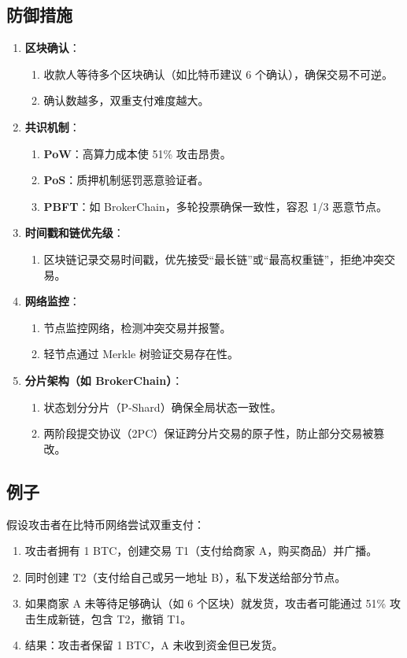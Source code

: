 \documentclass[12pt]{ctexart}
\begin{document}
\subsection{防御措施}
\begin{enumerate}
    \item \textbf{区块确认}：
        \begin{enumerate}
            \item 收款人等待多个区块确认（如比特币建议 6 个确认），确保交易不可逆。
            \item 确认数越多，双重支付难度越大。
        \end{enumerate}
    \item \textbf{共识机制}：
        \begin{enumerate}
            \item \textbf{PoW}：高算力成本使 51\% 攻击昂贵。
            \item \textbf{PoS}：质押机制惩罚恶意验证者。
            \item \textbf{PBFT}：如 BrokerChain，多轮投票确保一致性，容忍 1/3 恶意节点。
        \end{enumerate}
    \item \textbf{时间戳和链优先级}：
        \begin{enumerate}
            \item 区块链记录交易时间戳，优先接受“最长链”或“最高权重链”，拒绝冲突交易。
        \end{enumerate}
    \item \textbf{网络监控}：
        \begin{enumerate}
            \item 节点监控网络，检测冲突交易并报警。
            \item 轻节点通过 Merkle 树验证交易存在性。
        \end{enumerate}
    \item \textbf{分片架构（如 BrokerChain）}：
        \begin{enumerate}
            \item 状态划分分片（P-Shard）确保全局状态一致性。
            \item 两阶段提交协议（2PC）保证跨分片交易的原子性，防止部分交易被篡改。
        \end{enumerate}
\end{enumerate}

\subsection{例子}
假设攻击者在比特币网络尝试双重支付：
\begin{enumerate}
    \item 攻击者拥有 1 BTC，创建交易 T1（支付给商家 A，购买商品）并广播。
    \item 同时创建 T2（支付给自己或另一地址 B），私下发送给部分节点。
    \item 如果商家 A 未等待足够确认（如 6 个区块）就发货，攻击者可能通过 51\% 攻击生成新链，包含 T2，撤销 T1。
    \item 结果：攻击者保留 1 BTC，A 未收到资金但已发货。
\end{enumerate}
\end{document}
